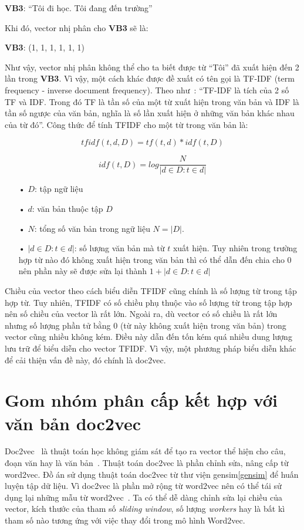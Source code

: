 \textbf{VB3}: ``Tôi đi học. Tôi đang đến trường''

Khi đó, vector nhị phân cho \textbf{VB3} sẽ là:

\textbf{VB3}: (1, 1, 1, 1, 1, 1)

Như vậy, vector nhị phân không thể cho ta biết được từ ``Tôi'' đã xuất hiện đến 2 lần trong \textbf{VB3}.
Vì vậy, một cách khác được đề xuất có tên gọi là TF-IDF (term frequency - inverse document frequency).
Theo như~\cite{tf-idf}: ``TF-IDF là tích của 2 số TF và IDF. Trong đó TF là tần số của một từ xuất hiện trong văn bản và IDF là tần số ngược của văn bản, nghĩa là số lần xuất hiện ở những văn bản khác nhau của từ đó''.
Công thức để tính TFIDF cho một từ trong văn bản là:

\begin{equation}
tfidf (t, d, D) = tf(t, d) * idf (t, D)
\end{equation}

\begin{equation}
idf (t, D) = log \frac{N}{|{d \in D: t \in d}|}
\end{equation}

\begin{enumerate}
\item[•]$D$: tập ngữ liệu
\item[•]$d$: văn bản thuộc tập $D$
\item[•]$N$: tổng số văn bản trong ngữ liệu $N = |D|$.
\item[•]$|{d \in D: t \in d}|$: số lượng văn bản mà từ $t$ xuất hiện. Tuy nhiên trong trường hợp từ nào đó không xuất hiện trong văn bản thì có thể dẫn đến chia cho 0 nên phần này sẽ được sửa lại thành  $1 + |{d \in D: t \in d}|$
\end{enumerate}

Chiều của vector theo cách biểu diễn TFIDF cũng chính là số lượng từ trong tập hợp từ.
Tuy nhiên, TFIDF có số chiều phụ thuộc vào số lượng từ trong tập hợp nên số chiều của vector là rất lớn.
Ngoài ra, dù vector có số chiều là rất lớn nhưng số lượng phần tử bằng 0 (từ này không xuất hiện trong văn bản) trong vector cũng nhiều không kém.
Điều này dẫn đến tốn kém quá nhiều dung lượng lưu trữ để biểu diễn cho vector TFIDF.
Vì vậy, một phương pháp biểu diễn khác để cải thiện vấn đề này, đó chính là doc2vec.
%
%


\section{Gom nhóm phân cấp kết hợp với văn bản doc2vec}
Doc2vec~\cite{doc2vec-original} là thuật toán học không giám sát để tạo ra vector thể hiện cho câu, đoạn văn hay là văn bản~\cite{doc2vec-1}.
Thuật toán doc2vec là phần chỉnh sửa, nâng cấp từ word2vec.
Đồ án sử dụng thuật toán doc2vec từ thư viện gensim\ref{gensim} để huấn luyện tập dữ liệu.
Vì doc2vec là phần mở rộng từ word2vec nên có thể tái sử dụng lại những mẫu từ word2vec~\cite{doc2vec-2}. 
Ta có thể dễ dàng chỉnh sửa lại chiều của vector, kích thước của tham số \textit{sliding window}, số lượng \textit{workers} hay là bất kì tham số nào tương ứng với việc thay đổi trong mô hình Word2vec.

